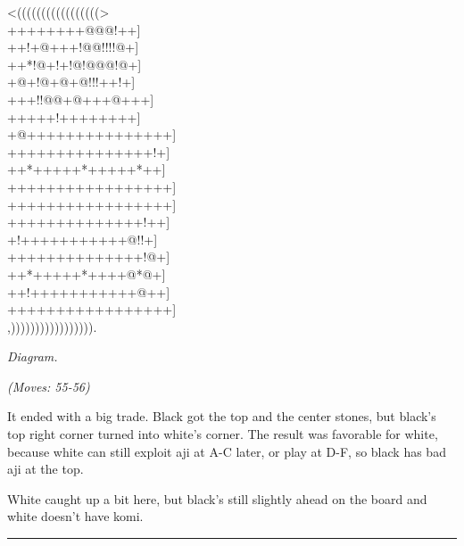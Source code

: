 \documentclass[letterpaper,12pt]{memoir}
\newcounter{GoFigure}[part]
\newcommand{\gofigure}{%
 \stepcounter{GoFigure}
 \centerline{\textit{Diagram.\thinspace\arabic{GoFigure}}}
}
\newcommand{\subtext}[1]{\centerline{\textit{#1}}}
\begin{document}
\begin{minipage}[t]{240pt}
{\gnos
<(((((((((((((((((>\\
++++++++@@@!++]\\
++!+@+++!@@!!!!@+]\\
++*!@+!+!@!@@@!@+]\\
+@+!@+@+@!!!++!+]\\
+++!!@@+@+++@+++]\\
+++++!++++++++]\\
+@+++++++++++++++]\\
+++++++++++++++!+]\\
++*+++++*+++++*++]\\
+++++++++++++++++]\\
+++++++++++++++++]\\
++++++++++++++!++]\\
+!+++++++++++@!!+]\\
++++++++++++++!@+]\\
++*+++++*++++@*@+]\\
++!+++++++++++@++]\\
+++++++++++++++++]\\
,))))))))))))))))).\\
}
\gofigure

\subtext{(Moves: 55-56)}
\end{minipage}
\begin{minipage}[t]{268.19999999999993pt}
\setlength{\parskip}{0.5em}
It ended with a big trade. Black got the top and the center stones, but black's top right corner turned into white's corner. The result was favorable for white, because white can still exploit aji at A-C later, or play at D-F, so black has bad aji at the top.

White caught up a bit here, but black's still slightly ahead on the board and white doesn't have komi.


\end{minipage}
\vfill

\rule{\textwidth}{0.5pt}
\end{document}
